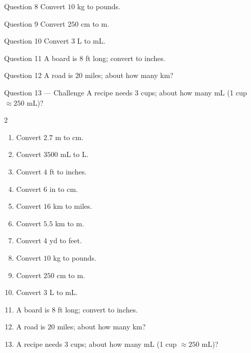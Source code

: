 \documentclass[11pt]{article}
\begin{document}
\begin{qbox}{Question 8}
Convert $10$ kg to pounds.\workspace{1.8cm}
\end{qbox}

\begin{qbox}{Question 9}
Convert $250$ cm to m.\workspace{1.8cm}
\end{qbox}

\begin{qbox}{Question 10}
Convert $3$ L to mL.\workspace{1.8cm}
\end{qbox}

\begin{qbox}{Question 11}
A board is $8$ ft long; convert to inches.\workspace{2.0cm}
\end{qbox}

\begin{qbox}{Question 12}
A road is $20$ miles; about how many km?\workspace{2.0cm}
\end{qbox}

\begin{qbox}{Question 13 --- Challenge}
A recipe needs $3$ cups; about how many mL (1 cup $\approx250$ mL)?\workspace{2.2cm}
\end{qbox}

\clearpage
{}

\begin{recapbox}
\begin{multicols}{2}
\small
\begin{enumerate}[leftmargin=*,itemsep=3pt]
  \item Convert $2.7$ m to cm.
  \item Convert $3500$ mL to L.
  \item Convert $4$ ft to inches.
  \item Convert $6$ in to cm.
  \item Convert $16$ km to miles.
  \item Convert $5.5$ km to m.
  \item Convert $4$ yd to feet.
  \item Convert $10$ kg to pounds.
  \item Convert $250$ cm to m.
  \item Convert $3$ L to mL.
  \item A board is $8$ ft long; convert to inches.
  \item A road is $20$ miles; about how many km?
  \item A recipe needs $3$ cups; about how many mL (1 cup $\approx250$ mL)?
\end{enumerate}
\end{multicols}
\end{recapbox}
\end{document}
